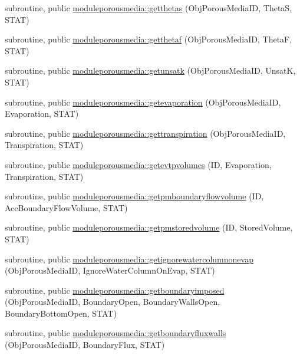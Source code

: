 \begin{DoxyCompactItemize}
\item 
subroutine, public \mbox{\hyperlink{namespacemoduleporousmedia_a13998a8a43bd8d705b0fbcf88cee6f50}{moduleporousmedia\+::getthetas}} (Obj\+Porous\+Media\+ID, ThetaS, S\+T\+AT)
\item 
subroutine, public \mbox{\hyperlink{namespacemoduleporousmedia_a80332ae529e97e277c38798d15633046}{moduleporousmedia\+::getthetaf}} (Obj\+Porous\+Media\+ID, ThetaF, S\+T\+AT)
\item 
subroutine, public \mbox{\hyperlink{namespacemoduleporousmedia_a8bdcde0305ffa37c3f25774f880927af}{moduleporousmedia\+::getunsatk}} (Obj\+Porous\+Media\+ID, UnsatK, S\+T\+AT)
\item 
subroutine, public \mbox{\hyperlink{namespacemoduleporousmedia_a03d64458de86e4672fab26f2e74233b8}{moduleporousmedia\+::getevaporation}} (Obj\+Porous\+Media\+ID, Evaporation, S\+T\+AT)
\item 
subroutine, public \mbox{\hyperlink{namespacemoduleporousmedia_ad069d36e784e065b5145cf9e5a29e786}{moduleporousmedia\+::gettranspiration}} (Obj\+Porous\+Media\+ID, Transpiration, S\+T\+AT)
\item 
subroutine, public \mbox{\hyperlink{namespacemoduleporousmedia_ac5c8b09a721ba8f3b2b3610d90098651}{moduleporousmedia\+::getevtpvolumes}} (ID, Evaporation, Transpiration, S\+T\+AT)
\item 
subroutine, public \mbox{\hyperlink{namespacemoduleporousmedia_af76c86e60836074eb54ae108e4cbb7e5}{moduleporousmedia\+::getpmboundaryflowvolume}} (ID, Acc\+Boundary\+Flow\+Volume, S\+T\+AT)
\item 
subroutine, public \mbox{\hyperlink{namespacemoduleporousmedia_a92e48a5d06b01af62070aecdf43d84e8}{moduleporousmedia\+::getpmstoredvolume}} (ID, Stored\+Volume, S\+T\+AT)
\item 
subroutine, public \mbox{\hyperlink{namespacemoduleporousmedia_ab3b8a6941c7523cd30e46b5a95be57de}{moduleporousmedia\+::getignorewatercolumnonevap}} (Obj\+Porous\+Media\+ID, Ignore\+Water\+Column\+On\+Evap, S\+T\+AT)
\item 
subroutine, public \mbox{\hyperlink{namespacemoduleporousmedia_a7ef0de747f82c7f61108e9f6033b260d}{moduleporousmedia\+::getboundaryimposed}} (Obj\+Porous\+Media\+ID, Boundary\+Open, Boundary\+Walls\+Open, Boundary\+Bottom\+Open, S\+T\+AT)
\item 
subroutine, public \mbox{\hyperlink{namespacemoduleporousmedia_a50641f9d2c506813ba712d8f3ba6438d}{moduleporousmedia\+::getboundaryfluxwalls}} (Obj\+Porous\+Media\+ID, Boundary\+Flux, S\+T\+AT)
\item 

\end{DoxyCompactItemize}
